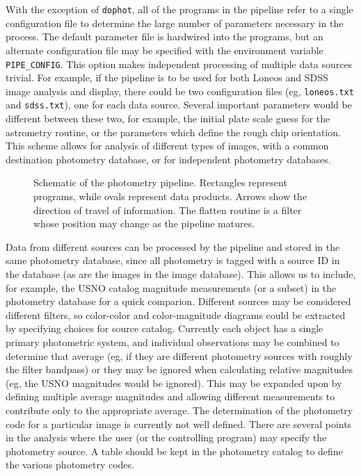\documentclass{article}
\begin{document}
With the exception of {\tt dophot}, all of the programs in the
pipeline refer to a single configuration file to determine the large
number of parameters necessary in the process.  The default parameter
file is hardwired into the programs, but an alternate configuration
file may be specified with the environment variable {\tt
  PIPE\_CONFIG}.  This option makes independent processing of multiple
data sources trivial.  For example, if the pipeline is to be used for
both Loneos and SDSS image analysis and display, there could be two
configuration files (eg, {\tt loneos.txt} and {\tt sdss.txt}), one for
each data source.  Several important parameters would be different
between these two, for example, the initial plate scale guess for the
astrometry routine, or the parameters which define the rough chip
orientation.  This scheme allows for analysis of different types of
images, with a common destination photometry database, or for
independent photometry databases.

\begin{figure}
\caption{\label{pipeline} 
Schematic of the photometry pipeline.  Rectangles represent programs,
while ovals represent data products.  Arrows show the direction of
travel of information.  The flatten routine is a filter whose position
may change as the pipeline matures.
}
\end{figure}

Data from different sources can be processed by the pipeline and
stored in the same photometry database, since all photometry is tagged
with a source ID in the database (as are the images in the image
database).  This allows us to include, for example, the USNO catalog
magnitude measurements (or a subset) in the photometry database for a
quick comparion.  Different sources may be considered different
filters, so color-color and color-magnitude diagrams could be
extracted by specifying choices for source catalog.  Currently each
object has a single primary photometric system, and individual
observations may be combined to determine that average (eg, if they
are different photometry sources with roughly the filter bandpass) or
they may be ignored when calculating relative magnitudes (eg, the USNO
magnitudes would be ignored).  This may be expanded upon by defining
multiple average magnitudes and allowing different measurements to
contribute only to the appropriate average.  The determination of the
photometry code for a particular image is currently not well defined.
There are several points in the analysis where the user (or the
controlling program) may specify the photometry source.  A table
should be kept in the photometry catalog to define the various
photometry codes.  
\end{document}
